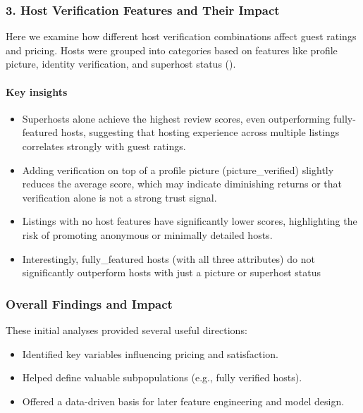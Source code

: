 \subsubsection*{3. Host Verification Features and Their Impact}

Here we examine how different host verification combinations affect guest ratings and pricing. Hosts were grouped into categories based on features like profile picture, identity verification, and superhost status ().

\vspace{0.5em}
\paragraph{Key insights}
\begin{itemize}
    \item Superhosts alone achieve the highest review scores, even outperforming fully-featured hosts, suggesting that hosting experience across multiple listings correlates strongly with guest ratings.
    \item Adding verification on top of a profile picture (picture\_verified) slightly reduces the average score, which may indicate diminishing returns or that verification alone is not a strong trust signal.
    \item Listings with no host features have significantly lower scores, highlighting the risk of promoting anonymous or minimally detailed hosts.
    \item Interestingly, fully\_featured hosts (with all three attributes) do not significantly outperform hosts with just a picture or superhost status
\end{itemize}

\subsubsection*{Overall Findings and Impact}

These initial analyses provided several useful directions:
\begin{itemize}
    \item Identified key variables influencing pricing and satisfaction.
    \item Helped define valuable subpopulations (e.g., fully verified hosts).
    \item Offered a data-driven basis for later feature engineering and model design.
\end{itemize}

